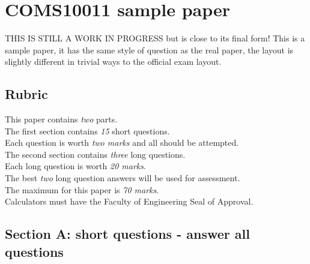 \documentclass{article}
\begin{document}
\section*{COMS10011 sample paper}

THIS IS STILL A WORK IN PROGRESS but is close to its final form! This
is a sample paper, it has the same style of question as the real
paper, the layout is slightly different in trivial ways to the
official exam layout.

\subsection*{Rubric}{
This paper contains \emph{two} parts. \\
The first section contains \emph {15} short questions.\\ 
Each question is worth \emph{two marks} and all should be attempted.\\
The second section contains \emph {three} long questions.\\
Each long question is worth \emph{20 marks}.\\
The best \emph{two} long question answers will be used for assessment. \\
The maximum for this paper is \emph{70 marks}. \\
Calculators must have the Faculty of Engineering Seal of Approval.}


\subsection*{Section A: short questions - answer all questions}
\end{document}
